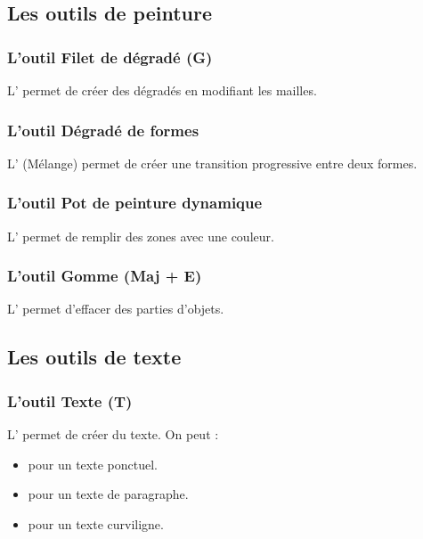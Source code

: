 \subsection{Les outils de peinture}

\subsubsection{L'outil Filet de dégradé (G)}

L' permet de créer des dégradés en modifiant les mailles.

\subsubsection{L'outil Dégradé de formes}

L' (Mélange) permet de créer une transition progressive entre deux formes.

\subsubsection{L'outil Pot de peinture dynamique}

L' permet de remplir des zones avec une couleur.

\subsubsection{L'outil Gomme (Maj + E)}

L' permet d'effacer des parties d'objets.

\subsection{Les outils de texte}

\subsubsection{L'outil Texte (T)}

L' permet de créer du texte. On peut :

\begin{itemize}
    \item {} pour un texte ponctuel.
    \item {} pour un texte de paragraphe.
    \item {} pour un texte curviligne.
\end{itemize}

